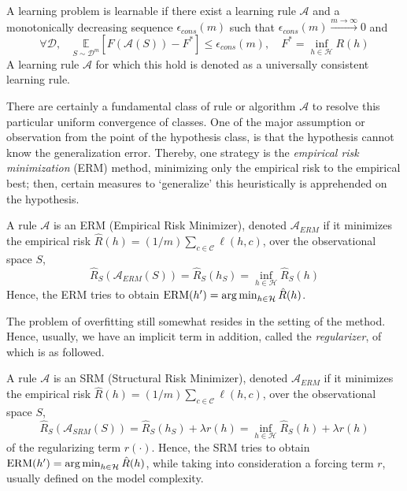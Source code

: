 \documentclass[10pt]{article}
\begin{document}
\begin{definition}
    A learning problem is learnable if there exist a learning rule $\mathcal{A}$ and a monotonically decreasing sequence $\epsilon_{cons}(m)$ such that $\epsilon_{cons}(m)\overset{m\to\infty}{\longrightarrow} 0$ and \begin{equation}
        \forall \mathcal{D} , \quad \underset{S\sim\mathcal{D}^{m}}{\mathbb{E}} \left[F(\mathcal{A}(S))-F^{*}\right] \leq \epsilon_{cons}(m) , \quad F^{*} = \inf_{h\in\mathcal{H}} R(h)
    \end{equation}
    A learning rule $\mathcal{A}$ for which this hold is denoted as a universally consistent learning rule. 
\end{definition}

There are certainly a fundamental class of rule or algorithm $\mathcal{A}$ to resolve this particular uniform convergence of classes. One of the major assumption or observation from the point of the hypothesis class, is that the hypothesis cannot know the generalization error. Thereby, one strategy is the \textit{empirical risk minimization} (ERM) method, minimizing only the empirical risk to the empirical best; then, certain measures to `generalize' this heuristically is apprehended on the hypothesis. 

\begin{definition}
    A rule $\mathcal{A}$ is an ERM (Empirical Risk Minimizer), denoted $\mathcal{A}_{ERM}$ if it minimizes the empirical risk $\hat{R}(h)=(1/m)\sum_{c\in\mathcal{C}}\ell(h,c)$, over the observational space $S$, 
    \begin{equation}
        \hat{R}_{S}(\mathcal{A}_{ERM}(S)) = \hat{R}_{S} (h_{S}) = \inf_{h\in\mathcal{H}} \hat{R}_{S}(h) 
    \end{equation}
    Hence, the ERM tries to obtain $\mathrm{ERM}(h') = \operatorname*{arg\,min}_{h\in \mathcal{H}} \hat{R}(h)$. 
\end{definition}

The problem of overfitting still somewhat resides in the setting of the method. Hence, usually, we have an implicit term in addition, called the \textit{regularizer}, of which is as followed. 

\begin{definition}
    A rule $\mathcal{A}$ is an SRM (Structural Risk Minimizer), denoted $\mathcal{A}_{ERM}$ if it minimizes the empirical risk $\hat{R}(h)=(1/m)\sum_{c\in\mathcal{C}}\ell(h,c)$, over the observational space $S$, 
    \begin{equation}
        \hat{R}_{S}(\mathcal{A}_{SRM}(S)) = \hat{R}_{S} (h_{S}) + \lambda r(h)= \inf_{h\in\mathcal{H}} \hat{R}_{S}(h) + \lambda r(h)
    \end{equation}
    of the regularizing term $r(\cdot)$. Hence, the SRM tries to obtain $\mathrm{ERM}(h') = \operatorname*{arg\,min}_{h\in \mathcal{H}} \hat{R}(h)$, while taking into consideration a forcing term $r$, usually defined on the model complexity. 
\end{definition}
\end{document}
